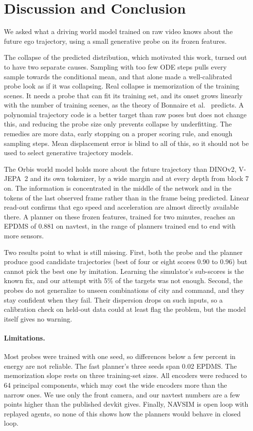 \section{Discussion and Conclusion}
\label{sec:conclusion}

We asked what a driving world model trained on raw video knows about the future
ego trajectory, using a small generative probe on its frozen features.

The collapse of the predicted distribution, which motivated this work, turned
out to have two separate causes. Sampling with too few ODE steps pulls every
sample towards the conditional mean, and that alone made a well-calibrated probe
look as if it was collapsing. Real collapse is memorization of the training
scenes. It needs a probe that can fit its training set, and its onset grows
linearly with the number of training scenes, as the theory of Bonnaire et
al.~\cite{bonnaire} predicts. A polynomial trajectory code is a better target
than raw poses but does not change this, and reducing the probe size only
prevents collapse by underfitting. The remedies are more data, early stopping on
a proper scoring rule, and enough sampling steps. Mean displacement error is
blind to all of this, so it should not be used to select generative trajectory
models.

The Orbis world model holds more about the future trajectory than DINOv2,
V-JEPA~2 and its own tokenizer, by a wide margin and at every depth from block 7
on. The information is concentrated in the middle of the network and in the
tokens of the last observed frame rather than in the frame being predicted.
Linear read-out confirms that ego speed and acceleration are almost directly
available there. A planner on these frozen features, trained for two minutes,
reaches an EPDMS of 0.881 on navtest, in the range of planners trained end to
end with more sensors.

Two results point to what is still missing. First, both the probe and the
planner produce good candidate trajectories (best of four or eight scores 0.90
to 0.96) but cannot pick the best one by imitation. Learning the simulator's
sub-scores is the known fix, and our attempt with 5\% of the targets was not
enough. Second, the probes do not generalize to unseen combinations of city and
command, and they stay confident when they fail. Their dispersion drops on such
inputs, so a calibration check on held-out data could at least flag the problem,
but the model itself gives no warning.

\paragraph{Limitations.}
Most probes were trained with one seed, so differences below a few percent in
energy are not reliable. The fast planner's three seeds span 0.02 EPDMS. The
memorization slope rests on three training-set sizes. All encoders were reduced
to 64 principal components, which may cost the wide encoders more than the
narrow ones. We use only the front camera, and our navtest numbers are a few
points higher than the published devkit gives. Finally, NAVSIM is open loop with replayed
agents, so none of this shows how the planners would behave in closed loop.
